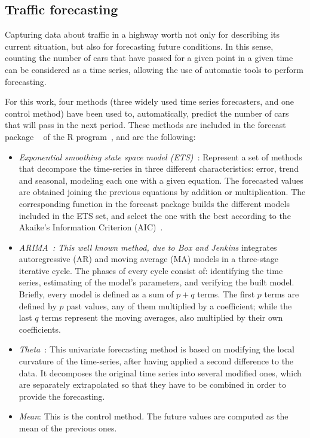 \subsection{Traffic forecasting}
\label{sub:ts_forecasting}
Capturing data about traffic in a highway worth not only for describing its current situation, but also for forecasting future conditions. In this sense, counting the number of cars that have passed for a given point in a given time can be considered as a time series, allowing the use of automatic tools to perform forecasting.

For this work, four methods (three widely used time series forecasters, and one control method) have been used to, automatically, predict the number of cars that will pass in the next period. These methods are included in the forecast package ~\cite{Hyndman08automatictime} of the R program~\cite{R:Bloomfield:2014}, and are the following:

\begin{itemize}
\item {\em Exponential smoothing state space model (ETS)~\cite{ETS:2008}}: Represent a set of methods that decompose the time-series in three different characteristics: error, trend and seasonal, modeling each one with a given equation. The forecasted values are obtained joining the previous equations by addition or multiplication. The corresponding function in the forecast package builds the different models included in the ETS set, and select the one with the best according to the Akaike's Information Criterion (AIC)~\cite{Akaike1973}.
\item {\em ARIMA~\cite{BoxJenk}: This well known method, due to Box and Jenkins } integrates autoregressive (AR) and moving average (MA) models in a three-stage iterative cycle. The phases of every cycle consist of: identifying the time series, estimating of the model's parameters, and verifying the built model. Briefly, every model is defined as a sum of $p+q$ terms. The first $p$  terms are defined by $p$ past values, any of them multiplied by a coefficient; while the last $q$ terms represent the moving averages, also multiplied by their own coefficients.
\item {\em Theta~\cite{Assima2000}}: This univariate forecasting method is based on modifying the local curvature of the time-series, after having applied a second difference to the data. It decomposes the original time series into several modified ones, which are separately extrapolated so that they have to be combined in order to provide the forecasting.
\item {\em Mean}: This is the control method. The future values are computed as the mean of the previous ones.
\end{itemize}


